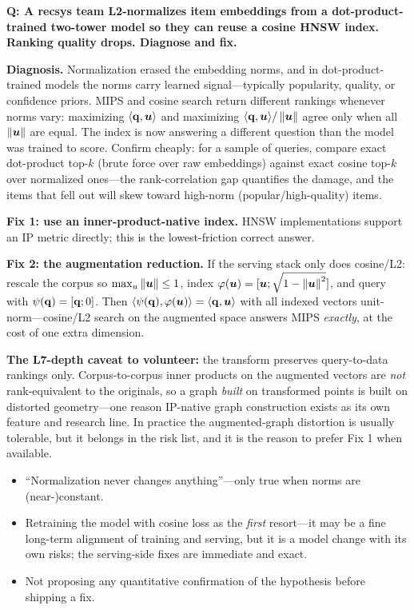 \begin{interviewq}
\textbf{Q: A recsys team L2-normalizes item embeddings from a dot-product-trained two-tower model so they can reuse a cosine HNSW index. Ranking quality drops. Diagnose and fix.}

 \quad {} \quad \badgefreq{\freqmed}

\stronganswer

\textbf{Diagnosis.} Normalization erased the embedding norms, and in dot-product-trained models the norms carry learned signal---typically popularity, quality, or confidence priors. MIPS and cosine search return different rankings whenever norms vary: maximizing $\langle\mathbf{q},\bm{u}\rangle$ and maximizing $\langle\mathbf{q},\bm{u}\rangle/\left\lVert\bm{u}\right\rVert$ agree only when all $\left\lVert\bm{u}\right\rVert$ are equal. The index is now answering a different question than the model was trained to score. Confirm cheaply: for a sample of queries, compare exact dot-product top-$k$ (brute force over raw embeddings) against exact cosine top-$k$ over normalized ones---the rank-correlation gap quantifies the damage, and the items that fell out will skew toward high-norm (popular/high-quality) items.

\textbf{Fix 1: use an inner-product-native index.} HNSW implementations support an IP metric directly; this is the lowest-friction correct answer.

\textbf{Fix 2: the augmentation reduction.} If the serving stack only does cosine/L2: rescale the corpus so $\max_u \left\lVert\bm{u}\right\rVert \le 1$, index $\varphi(\bm{u}) = [\bm{u}; \sqrt{1 - \left\lVert\bm{u}\right\rVert^2}]$, and query with $\psi(\mathbf{q}) = [\mathbf{q}; 0]$. Then $\langle\psi(\mathbf{q}),\varphi(\bm{u})\rangle = \langle\mathbf{q},\bm{u}\rangle$ with all indexed vectors unit-norm---cosine/L2 search on the augmented space answers MIPS \emph{exactly}, at the cost of one extra dimension.

\textbf{The L7-depth caveat to volunteer:} the transform preserves query-to-data rankings only. Corpus-to-corpus inner products on the augmented vectors are \emph{not} rank-equivalent to the originals, so a graph \emph{built} on transformed points is built on distorted geometry---one reason IP-native graph construction exists as its own feature and research line. In practice the augmented-graph distortion is usually tolerable, but it belongs in the risk list, and it is the reason to prefer Fix 1 when available.

\redflags
\begin{itemize}
    \item ``Normalization never changes anything''---only true when norms are (near-)constant.
    \item Retraining the model with cosine loss as the \emph{first} resort---it may be a fine long-term alignment of training and serving, but it is a model change with its own risks; the serving-side fixes are immediate and exact.
    \item Not proposing any quantitative confirmation of the hypothesis before shipping a fix.
\end{itemize}


\end{interviewq}

